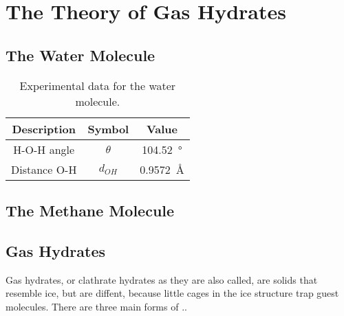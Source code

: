 \chapter{The Theory of Gas Hydrates}
\section{The Water Molecule}
\begin{table}[h!tb]
\caption{Experimental data for the water molecule.}
\label{tb:intro:h2odata}
\begin{center}
\begin{tabular}{c|c|c}
Description & Symbol & Value \\
\hline
H-O-H angle & $\theta$ & \SI{104.52}{\degree} \\
Distance O-H & $d_{OH}$ & \SI{0.9572}{\angstrom} \\
\end{tabular}
\end{center}
\end{table}

\section{The Methane Molecule}

\section{Gas Hydrates}
Gas hydrates, or clathrate hydrates as they are also called, are solids that resemble ice, but are diffent, because little cages in the ice structure trap guest molecules. There are three main forms of ..